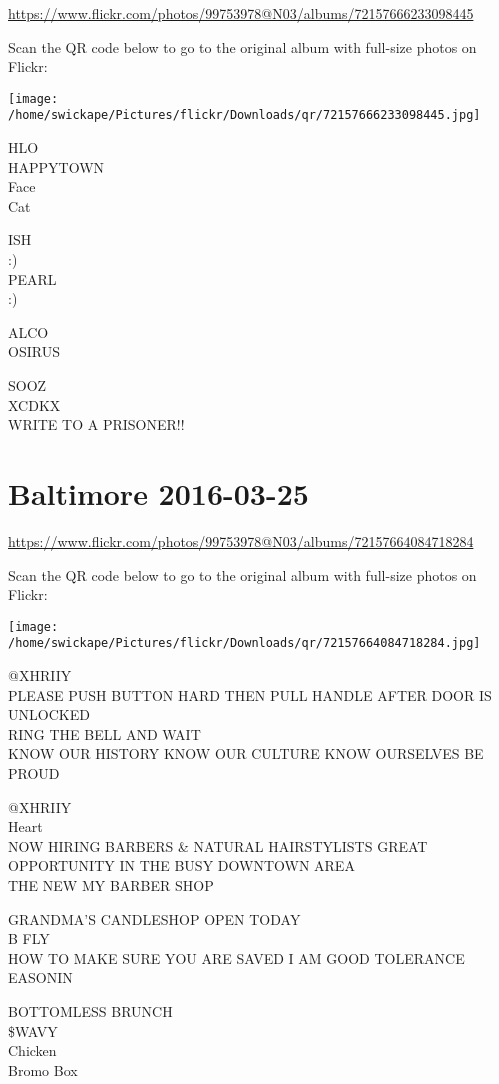 \documentclass[10pt,letterpaper]{article}
\begin{document}
\url{https://www.flickr.com/photos/99753978@N03/albums/72157666233098445}

Scan the QR code below to go to the original album with full-size photos on Flickr:

\texttt{[image: /home/swickape/Pictures/flickr/Downloads/qr/72157666233098445.jpg]}
\pagebreak

HLO\\
HAPPYTOWN\\
Face\\
Cat

ISH\\
:)\\
PEARL\\
:)

ALCO\\
OSIRUS

SOOZ\\
XCDKX\\
WRITE TO A PRISONER!!
\pagebreak

\section*{Baltimore 2016-03-25}

\url{https://www.flickr.com/photos/99753978@N03/albums/72157664084718284}

Scan the QR code below to go to the original album with full-size photos on Flickr:

\texttt{[image: /home/swickape/Pictures/flickr/Downloads/qr/72157664084718284.jpg]}
\pagebreak

@XHRIIY\\
PLEASE PUSH BUTTON HARD THEN PULL HANDLE AFTER DOOR IS UNLOCKED\\
RING THE BELL AND WAIT\\
KNOW OUR HISTORY KNOW OUR CULTURE KNOW OURSELVES BE PROUD

@XHRIIY\\
Heart\\
NOW HIRING BARBERS \& NATURAL HAIRSTYLISTS GREAT OPPORTUNITY IN THE BUSY DOWNTOWN AREA\\
THE NEW MY BARBER SHOP

GRANDMA'S CANDLESHOP OPEN TODAY\\
B FLY\\
HOW TO MAKE SURE YOU ARE SAVED I AM GOOD TOLERANCE\\
EASONIN

BOTTOMLESS BRUNCH\\
\$WAVY\\
Chicken\\
Bromo Box
\end{document}
